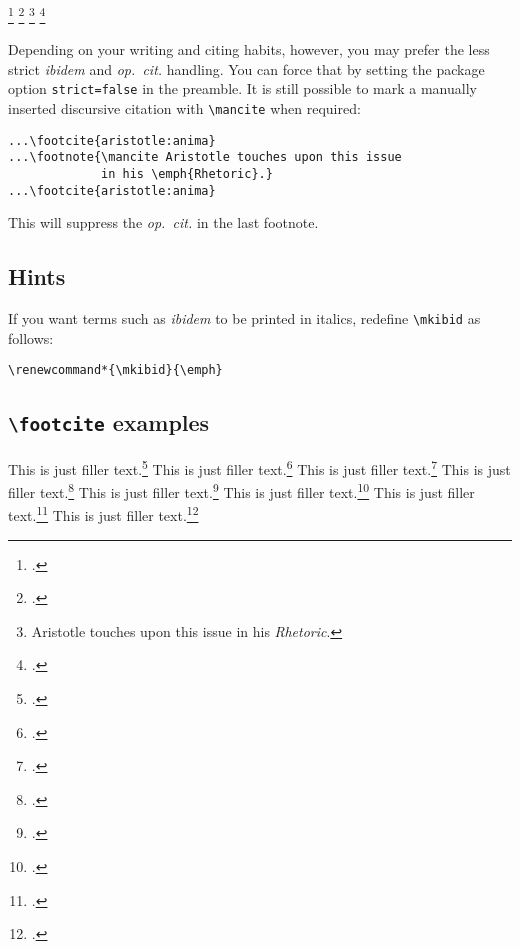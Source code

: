 \documentclass[a4paper]{article}
\newcommand{\cmd}[1]{\texttt{\textbackslash #1}}
\newenvironment*{pseudofootnotes*}
  {\pseudofootnotes
   \def\footnote##1{\item##1\mancite}}
  {\endpseudofootnotes}
\begin{document}
\begin{pseudofootnotes*}
\footcite{aristotle:anima}
\footcite{aristotle:anima}
\footnote{Aristotle touches upon this issue in his \emph{Rhetoric}.}
\footcite{aristotle:anima}
\end{pseudofootnotes*}
%
Depending on your writing and citing habits, however, you may prefer
the less strict \emph{ibidem} and \emph{op.~cit.} handling. You can
force that by setting the package option \texttt{strict=false} in
the preamble. It is still possible to mark a manually inserted
discursive citation with \cmd{mancite} when required:

\begin{verbatim}
...\footcite{aristotle:anima}
...\footnote{\mancite Aristotle touches upon this issue 
             in his \emph{Rhetoric}.}
...\footcite{aristotle:anima}
\end{verbatim}
%
This will suppress the \emph{op.~cit.} in the last footnote.

\subsection*{Hints}

If you want terms such as \emph{ibidem} to be printed in italics,
redefine \cmd{mkibid} as follows:

\begin{verbatim}
\renewcommand*{\mkibid}{\emph}
\end{verbatim}

\clearpage

\subsection*{\cmd{footcite} examples}

This is just filler text.\footcite{aristotle:anima}
This is just filler text.\footcite{averroes/bland}
This is just filler text.\footcite[26]{aristotle:anima}
This is just filler text.\footcite[59--61]{averroes/bland}
This is just filler text.\footcite{aristotle:anima}
This is just filler text.\footcite{aristotle:anima}
This is just filler text.\footcite[25]{aristotle:anima}
This is just filler text.\footcite[25]{aristotle:anima}
\end{document}
